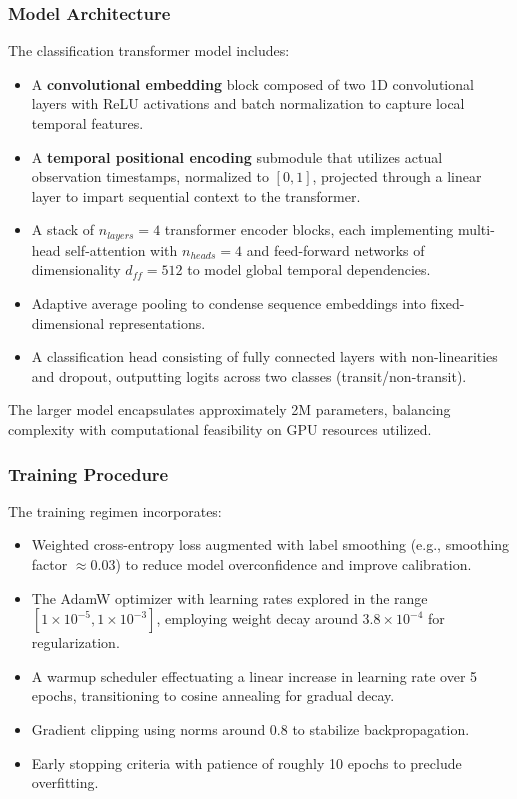\documentclass[letterpaper]{article} %
\begin{document}
\subsubsection*{Model Architecture}

The classification transformer model includes:

\begin{itemize}
    \item A \textbf{convolutional embedding} block composed of two 1D convolutional layers with ReLU activations and batch normalization to capture local temporal features.
    \item A \textbf{temporal positional encoding} submodule that utilizes actual observation timestamps, normalized to \([0,1]\), projected through a linear layer to impart sequential context to the transformer.
    \item A stack of \(n_{layers}=4\) transformer encoder blocks, each implementing multi-head self-attention with \(n_{heads}=4\) and feed-forward networks of dimensionality \(d_{ff}=512\) to model global temporal dependencies.
    \item Adaptive average pooling to condense sequence embeddings into fixed-dimensional representations.
    \item A classification head consisting of fully connected layers with non-linearities and dropout, outputting logits across two classes (transit/non-transit).
\end{itemize}

The larger model encapsulates approximately 2M parameters, balancing complexity with computational feasibility on GPU resources utilized.

\subsubsection*{Training Procedure}

The training regimen incorporates:

\begin{itemize}
    \item Weighted cross-entropy loss augmented with label smoothing (e.g., smoothing factor \(\approx 0.03\)) to reduce model overconfidence and improve calibration.
    \item The AdamW optimizer with learning rates explored in the range \([1\times10^{-5}, 1\times10^{-3}]\), employing weight decay around \(3.8 \times 10^{-4}\) for regularization.
    \item A warmup scheduler effectuating a linear increase in learning rate over 5 epochs, transitioning to cosine annealing for gradual decay.
    \item Gradient clipping using norms around 0.8 to stabilize backpropagation.
    \item Early stopping criteria with patience of roughly 10 epochs to preclude overfitting.
\end{itemize}
\end{document}
